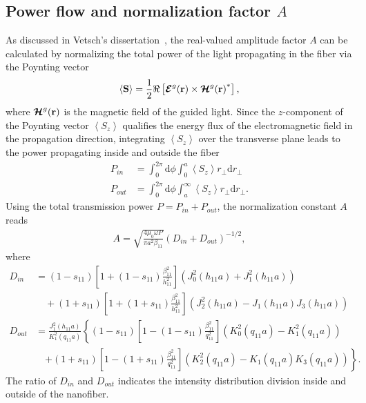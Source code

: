 \subsection{Power flow and normalization factor $ A $}
As discussed in Vetsch's dissertation~\cite{Vetsch2010a}, the real-valued amplitude factor $ A $ can be calculated by normalizing the total power of the light propagating in the fiber via the Poynting vector
\begin{align}
\left<\mathbf{S}\right>=\frac{1}{2} \Re\left[\boldsymbol{\mathcal{E}}^g(\mathbf{r})\times{\boldsymbol{\mathcal{H}}^g(\mathbf{r})}^* \right],
\end{align}
where $ \boldsymbol{\mathcal{H}}^g(\mathbf{r}) $ is the magnetic field of the guided light. 
Since the $ z $-component of the Poynting vector $ \left< S_z\right> $ qualifies the energy flux of the electromagnetic field in the propagation direction, integrating $ \left< S_z \right> $ over the transverse plane leads to the power propagating inside and outside the fiber
\begin{align}
P_{in} &= \int_0^{2\pi} \mathrm{d}\phi \int_0^a \left< S_z \right> r_\perp \mathrm{d}r_\perp\\
P_{out} &= \int_0^{2\pi} \mathrm{d}\phi \int_a^\infty \left< S_z \right> r_\perp \mathrm{d}r_\perp.
\end{align}
Using the total transmission power $ P=P_{in}+P_{out} $, the normalization constant $ A $ reads
\begin{align}\label{eq:A}
A=\sqrt{\frac{4\mu_0\omega P}{\pi a^2 \beta_{11}}}\left(D_{in} + D_{out} \right)^{-1/2},
\end{align}
where
\begin{align}
D_{in} &= (1-s_{11})\left[ 1+(1-s_{11})\frac{\beta_{11}^2}{h_{11}^2}\right] \left(J_0^2(h_{11}a) + J_1^2(h_{11}a) \right) \nonumber\\
&\quad + (1+s_{11})\left[ 1+(1+s_{11})\frac{\beta_{11}^2}{h_{11}^2}\right] \left(J_2^2(h_{11}a)- J_1(h_{11}a)J_3(h_{11}a) \right)\\
D_{out} &= \frac{J_1^2(h_{11}a)}{K_1^2(q_{11}a)}\left\{ (1-s_{11})\left[ 1-(1-s_{11})\frac{\beta_{11}^2}{q_{11}^2}\right] \left(K_0^2(q_{11}a) - K_1^2(q_{11}a) \right)\right. \nonumber\\
&\quad \left. + (1\!+\! s_{11})\left[ 1\!-\! (1\!+\! s_{11})\frac{\beta_{11}^2}{q_{11}^2}\right] \left(K_2^2(q_{11}a)\! -\! K_1(q_{11}a)K_3(q_{11}a) \right) \right\}.
\end{align}
The ratio of $ D_{in} $ and $ D_{out} $ indicates the intensity distribution division inside and outside of the nanofiber. 


